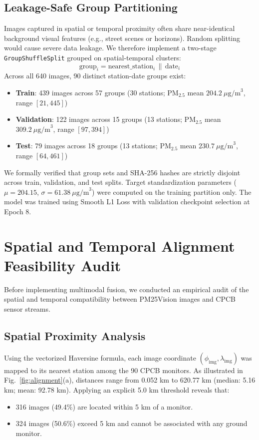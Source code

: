\documentclass[conference]{IEEEtran}
\begin{document}
\subsection{Leakage-Safe Group Partitioning}
Images captured in spatial or temporal proximity often share near-identical background visual features (e.g., street scenes or horizons). Random splitting would cause severe data leakage. We therefore implement a two-stage \texttt{GroupShuffleSplit} grouped on spatial-temporal clusters:
\begin{equation}
\text{group}_i = \text{nearest\_station}_i \,\|\, \text{date}_i
\end{equation}
Across all 640 images, 90 distinct station-date groups exist:
\begin{itemize}
    \item \textbf{Train}: 439 images across 57 groups (30 stations; $\text{PM}_{2.5}$ mean $204.2\ \mu\text{g/m}^3$, range $[21, 445]$)
    \item \textbf{Validation}: 122 images across 15 groups (13 stations; $\text{PM}_{2.5}$ mean $309.2\ \mu\text{g/m}^3$, range $[97, 394]$)
    \item \textbf{Test}: 79 images across 18 groups (13 stations; $\text{PM}_{2.5}$ mean $230.7\ \mu\text{g/m}^3$, range $[64, 461]$)
\end{itemize}
We formally verified that group sets and SHA-256 hashes are strictly disjoint across train, validation, and test splits. Target standardization parameters ($\mu = 204.15$, $\sigma = 61.38\ \mu\text{g/m}^3$) were computed on the training partition only. The model was trained using Smooth L1 Loss with validation checkpoint selection at Epoch 8.

\section{Spatial and Temporal Alignment Feasibility Audit}

Before implementing multimodal fusion, we conducted an empirical audit of the spatial and temporal compatibility between PM25Vision images and CPCB sensor streams.

\subsection{Spatial Proximity Analysis}
Using the vectorized Haversine formula, each image coordinate $(\phi_{\text{img}}, \lambda_{\text{img}})$ was mapped to its nearest station among the 90 CPCB monitors. As illustrated in Fig.~\ref{fig:alignment}(a), distances range from 0.052 km to 620.77 km (median: 5.16 km; mean: 92.78 km). Applying an explicit 5.0 km threshold reveals that:
\begin{itemize}
    \item 316 images (49.4\%) are located within 5 km of a monitor.
    \item 324 images (50.6\%) exceed 5 km and cannot be associated with any ground monitor.
\end{itemize}
\end{document}
